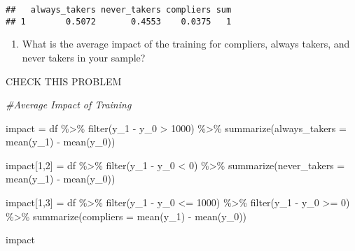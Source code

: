 \documentclass[
]{article}
\newenvironment{Shaded}{\begin{snugshade}}{\end{snugshade}}
\newcommand{\AttributeTok}[1]{\textcolor[rgb]{0.77,0.63,0.00}{#1}}
\newcommand{\CommentTok}[1]{\textcolor[rgb]{0.56,0.35,0.01}{\textit{#1}}}
\newcommand{\DecValTok}[1]{\textcolor[rgb]{0.00,0.00,0.81}{#1}}
\newcommand{\FunctionTok}[1]{\textcolor[rgb]{0.00,0.00,0.00}{#1}}
\newcommand{\NormalTok}[1]{#1}
\newcommand{\OtherTok}[1]{\textcolor[rgb]{0.56,0.35,0.01}{#1}}
\newcommand{\SpecialCharTok}[1]{\textcolor[rgb]{0.00,0.00,0.00}{#1}}
\providecommand{\tightlist}{%
  \setlength{\itemsep}{0pt}\setlength{\parskip}{0pt}}
\begin{document}
\begin{verbatim}
##   always_takers never_takers compliers sum
## 1        0.5072       0.4553    0.0375   1
\end{verbatim}

\begin{enumerate}
\def\labelenumi{\arabic{enumi}.}
\setcounter{enumi}{2}
\tightlist
\item
  What is the average impact of the training for compliers, always
  takers, and never takers in your sample?
\end{enumerate}

CHECK THIS PROBLEM

\begin{Shaded}
\begin{Highlighting}[]
\CommentTok{\#Average Impact of Training}

\NormalTok{impact }\OtherTok{=}\NormalTok{ df }\SpecialCharTok{\%\textgreater{}\%}
  \FunctionTok{filter}\NormalTok{(y\_1 }\SpecialCharTok{{-}}\NormalTok{ y\_0 }\SpecialCharTok{\textgreater{}} \DecValTok{1000}\NormalTok{) }\SpecialCharTok{\%\textgreater{}\%}
  \FunctionTok{summarize}\NormalTok{(}\AttributeTok{always\_takers =} \FunctionTok{mean}\NormalTok{(y\_1) }\SpecialCharTok{{-}} \FunctionTok{mean}\NormalTok{(y\_0))}

\NormalTok{impact[}\DecValTok{1}\NormalTok{,}\DecValTok{2}\NormalTok{] }\OtherTok{=}\NormalTok{ df }\SpecialCharTok{\%\textgreater{}\%}
  \FunctionTok{filter}\NormalTok{(y\_1 }\SpecialCharTok{{-}}\NormalTok{ y\_0 }\SpecialCharTok{\textless{}} \DecValTok{0}\NormalTok{) }\SpecialCharTok{\%\textgreater{}\%}
  \FunctionTok{summarize}\NormalTok{(}\AttributeTok{never\_takers =} \FunctionTok{mean}\NormalTok{(y\_1) }\SpecialCharTok{{-}} \FunctionTok{mean}\NormalTok{(y\_0))}

\NormalTok{impact[}\DecValTok{1}\NormalTok{,}\DecValTok{3}\NormalTok{] }\OtherTok{=}\NormalTok{ df }\SpecialCharTok{\%\textgreater{}\%}
  \FunctionTok{filter}\NormalTok{(y\_1 }\SpecialCharTok{{-}}\NormalTok{ y\_0 }\SpecialCharTok{\textless{}=} \DecValTok{1000}\NormalTok{) }\SpecialCharTok{\%\textgreater{}\%}
  \FunctionTok{filter}\NormalTok{(y\_1 }\SpecialCharTok{{-}}\NormalTok{ y\_0 }\SpecialCharTok{\textgreater{}=} \DecValTok{0}\NormalTok{) }\SpecialCharTok{\%\textgreater{}\%}
  \FunctionTok{summarize}\NormalTok{(}\AttributeTok{compliers =} \FunctionTok{mean}\NormalTok{(y\_1) }\SpecialCharTok{{-}} \FunctionTok{mean}\NormalTok{(y\_0))}

\NormalTok{impact}
\end{Highlighting}
\end{Shaded}
\end{document}

